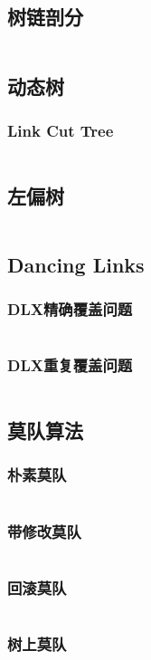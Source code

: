 \documentclass[a4paper,12pt]{article}
\begin{document}
\subsection{树链剖分}
\inputminted[breaklines, linenos]{c++}{ds/hld.cc}
\subsection{动态树}
\subsubsection{Link Cut Tree}
\inputminted[breaklines, linenos]{c++}{ds/lct.cc}
\subsection{左偏树}
\inputminted[breaklines, linenos]{c++}{ds/leftist.cc}
\subsection{Dancing Links}
\subsubsection{DLX精确覆盖问题}
\inputminted[breaklines, linenos]{c++}{ds/exact_cover.cc}
\subsubsection{DLX重复覆盖问题}
\inputminted[breaklines, linenos]{c++}{ds/multi_cover.cc}
\subsection{莫队算法}
\subsubsection{朴素莫队}
\inputminted[breaklines, linenos]{c++}{ds/mo.cc}
\subsubsection{带修改莫队}
\inputminted[breaklines, linenos]{c++}{ds/modify_mo.cc}
\subsubsection{回滚莫队}
\inputminted[breaklines, linenos]{c++}{ds/rollback_mo.cc}
\subsubsection{树上莫队}
\inputminted[breaklines, linenos]{c++}{ds/tree_mo.cc}
\end{document}
